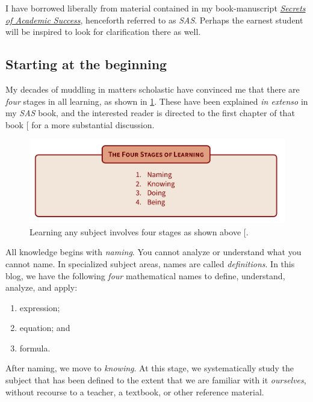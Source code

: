 \documentclass[
  a4paper,
]{article}
\providecommand{\tightlist}{%
  \setlength{\itemsep}{0pt}\setlength{\parskip}{0pt}}
\begin{document}
I have borrowed liberally from material contained in my book-manuscript
\href{https://swanlotus.netlify.app/sas-manuscript/SAS-partial.pdf}{\emph{Secrets
of Academic Success}}, henceforth referred to as \emph{SAS}. Perhaps the
earnest student will be inspired to look for clarification there as
well.  \normalfont

\subsection{Starting at the beginning}\label{starting-at-the-beginning}

My decades of muddling in matters scholastic have convinced me that
there are \emph{four} stages in all learning, as shown in
\cref{fig:four-stages}. These have been explained \emph{in extenso} in
my \emph{SAS} book, and the interested reader is directed to the first
chapter of that book {[}\citeproc{ref-sas}{1}{]} for a more substantial
discussion.

\begin{figure}
\centering
\includegraphics[width=0.9\linewidth,height=\textheight,keepaspectratio]{images/four-stages-of-learning.png}
\caption{Learning any subject involves four stages as shown above
{[}\citeproc{ref-sas}{1}{]}.}\label{fig:four-stages}
\end{figure}

All knowledge begins with \emph{naming}. You cannot analyze or
understand what you cannot name. In specialized subject areas, names are
called \emph{definitions}. In this blog, we have the following
\emph{four} mathematical names to define, understand, analyze, and
apply:

\begin{enumerate}
\tightlist
\item
  expression;
\item
  equation; and
\item
  formula.
\end{enumerate}

After naming, we move to \emph{knowing}. At this stage, we
systematically study the subject that has been defined to the extent
that we are familiar with it \emph{ourselves}, without recourse to a
teacher, a textbook, or other reference material.
\end{document}
